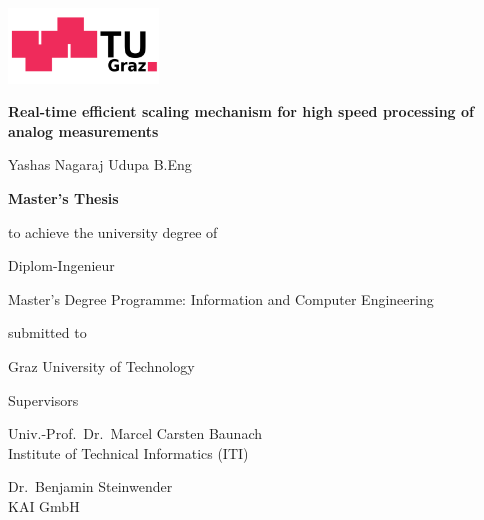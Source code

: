 \cleardoublepage

\vspace*{-2cm}

\begin{center}
\includegraphics[height=2cm]{images/TUGRAZLOGO.PNG}

\vspace{2cm}

{\LARGE\sffamily\bfseries
 Real-time efficient scaling mechanism for high speed processing of analog measurements 
\par%
}

\vspace{1.5cm}

{\Large\sffamily Yashas Nagaraj Udupa B.Eng}

\vspace{1.25cm}

{\Large\sffamily\bfseries Master's Thesis}

\vspace{4mm}

{\small\sffamily to achieve the university degree of}

\vspace{4mm}

{\normalsize\sffamily Diplom-Ingenieur}

\vspace{4mm}

{\normalsize\sffamily
Master's Degree Programme: Information and Computer Engineering
}

\vspace{0.5cm}

{\small\sffamily submitted to}

\vspace{2mm}

{\large\sffamily Graz University of Technology}

\vspace{0.5cm}

{\small\sffamily Supervisors}

\vspace{2mm}

{\normalsize\sffamily
Univ.-Prof.\ Dr.\ Marcel Carsten Baunach \\
Institute of Technical Informatics 	(ITI)
}

\vspace{0.5cm}

{\normalsize\sffamily
Dr.\ Benjamin Steinwender \\
KAI GmbH
}

\vspace{1.5cm}


\end{center}


